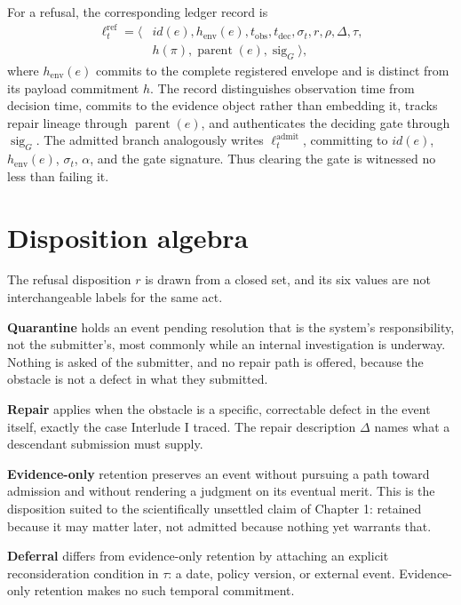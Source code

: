 \documentclass[11pt,openany]{book}
\begin{document}
For a refusal, the corresponding ledger record is
\[
\begin{aligned}
\ell_t^{\mathrm{ref}}=\langle&id(e),h_{\mathrm{env}}(e),t_{\mathrm{obs}},
t_{\mathrm{dec}},\sigma_t,r,\rho,\Delta,\tau,\\
&h(\pi),\operatorname{parent}(e),\operatorname{sig}_G\rangle,
\end{aligned}
\]
where \(h_{\mathrm{env}}(e)\) commits to the complete registered envelope and
is distinct from its payload commitment \(h\). The record distinguishes
observation time from decision time, commits to the evidence object rather than
embedding it, tracks repair lineage through \(\operatorname{parent}(e)\), and
authenticates the deciding gate through \(\operatorname{sig}_G\). The admitted
branch analogously writes \(\ell_t^{\mathrm{admit}}\), committing to
\(id(e)\), \(h_{\mathrm{env}}(e)\), \(\sigma_t\), \(\alpha\), and the gate
signature. Thus clearing the gate is witnessed no less than failing it.

\section{Disposition algebra}

The refusal disposition \(r\) is drawn from a closed set, and its six values
are not interchangeable labels for the same act.

\textbf{Quarantine} holds an event pending resolution that is the system's
responsibility, not the submitter's, most commonly while an internal
investigation is underway. Nothing is asked of the submitter, and no repair
path is offered, because the obstacle is not a defect in what they submitted.

\textbf{Repair} applies when the obstacle is a specific, correctable defect in
the event itself, exactly the case Interlude I traced. The repair description
\(\Delta\) names what a descendant submission must supply.

\textbf{Evidence-only} retention preserves an event without pursuing a path
toward admission and without rendering a judgment on its eventual merit. This
is the disposition suited to the scientifically unsettled claim of Chapter 1:
retained because it may matter later, not admitted because nothing yet warrants
that.

\textbf{Deferral} differs from evidence-only retention by attaching an
explicit reconsideration condition in \(\tau\): a date, policy version, or
external event. Evidence-only retention makes no such temporal commitment.
\end{document}

